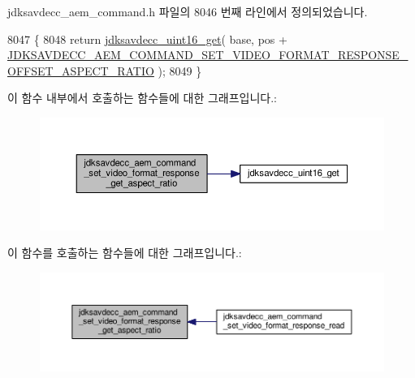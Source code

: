 jdksavdecc\+\_\+aem\+\_\+command.\+h 파일의 8046 번째 라인에서 정의되었습니다.


\begin{DoxyCode}
8047 \{
8048     \textcolor{keywordflow}{return} \hyperlink{group__endian_ga3fbbbc20be954aa61e039872965b0dc9}{jdksavdecc\_uint16\_get}( base, pos + 
      \hyperlink{group__command__set__video__format__response_ga9eeac2880ba296cfe543b79e60db5d65}{JDKSAVDECC\_AEM\_COMMAND\_SET\_VIDEO\_FORMAT\_RESPONSE\_OFFSET\_ASPECT\_RATIO}
       );
8049 \}
\end{DoxyCode}


이 함수 내부에서 호출하는 함수들에 대한 그래프입니다.\+:
\nopagebreak
\begin{figure}[H]
\begin{center}
\leavevmode
\includegraphics[width=350pt]{group__command__set__video__format__response_gaebc0d053b3ad2b15b2e2f6910591acbe_cgraph}
\end{center}
\end{figure}




이 함수를 호출하는 함수들에 대한 그래프입니다.\+:
\nopagebreak
\begin{figure}[H]
\begin{center}
\leavevmode
\includegraphics[width=350pt]{group__command__set__video__format__response_gaebc0d053b3ad2b15b2e2f6910591acbe_icgraph}
\end{center}
\end{figure}


